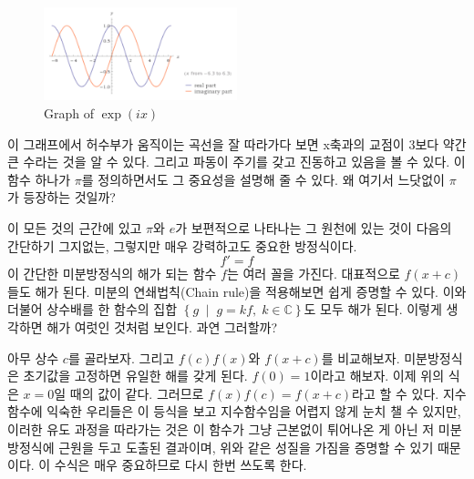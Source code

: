 \documentclass[10pt]{article}
\begin{document}
\begin{figure}
  \centering
  \includegraphics[width = 0.5\textwidth]{exponential.png}
  \caption{Graph of $\exp\left(ix\right)$}
\end{figure}
이 그래프에서 허수부가 움직이는 곡선을 잘 따라가다 보면 x축과의 교점이 3보다 약간 큰 수라는 것을 알 수 있다. 그리고 파동이 주기를 갖고 진동하고 있음을 볼 수 있다. 이 함수 하나가 $\pi$를 정의하면서도 그 중요성을 설명해 줄 수 있다. 왜 여기서 느닷없이 $\pi$가 등장하는 것일까? \par
이 모든 것의 근간에 있고 $\pi$와 $e$가 보편적으로 나타나는 그 원천에 있는 것이 다음의 간단하기 그지없는, 그렇지만 매우 강력하고도 중요한 방정식이다.
$$
  f' = f
$$
이 간단한 미분방정식의 해가 되는 함수 $f$는 여러 꼴을 가진다. 대표적으로 $f\left(x+c\right)$들도 해가 된다. 미분의 연쇄법칙(Chain rule)을 적용해보면 쉽게 증명할 수 있다. 이와 더불어 상수배를 한 함수의 집합 $\left\{g\;\middle|\; g = kf, \; k\in\mathbb{C}\right\}$도 모두 해가 된다. 이렇게 생각하면 해가 여럿인 것처럼 보인다. 과연 그러할까? \par
아무 상수 $c$를 골라보자. 그리고 $f\left(c\right)f\left(x\right)$와 $f\left(x+c\right)$를 비교해보자. 미분방정식은 초기값을 고정하면 유일한 해를 갖게 된다. $f\left(0\right) = 1$이라고 해보자. 이제 위의 식은 $x = 0$일 때의 값이 같다. 그러므로 $f\left(x\right)f\left(c\right) = f\left(x+c\right)$라고 할 수 있다. 지수 함수에 익숙한 우리들은 이 등식을 보고 지수함수임을 어렵지 않게 눈치 챌 수 있지만, 이러한 유도 과정을 따라가는 것은 이 함수가 그냥 근본없이 튀어나온 게 아닌 저 미분방정식에 근원을 두고 도출된 결과이며, 위와 같은 성질을 가짐을 증명할 수 있기 때문이다. 이 수식은 매우 중요하므로 다시 한번 쓰도록 한다.
\end{document}
